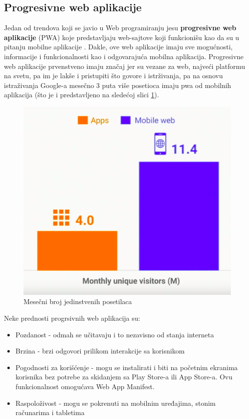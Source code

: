 \documentclass[a4paper]{article}
\begin{document}
\subsection{Progresivne web aplikacije}
\label{subsec:progresivne web aplikacije}

Jedan od trendova koji se javio u Web programiranju jesu \textbf{progresivne web aplikacije} (PWA) koje predstavljaju web-sajtove koji funkcionišu kao da su u pitanju mobilne aplikacije \cite{pwa}. Dakle, ove web aplikacije imaju sve mogućnosti, informacije i funkcionalnosti kao i odgovarajuća mobilna aplikacija. Progresivne web aplikacije prvenstveno imaju značaj jer su vezane za web, najveći platformu na svetu, pa im je lakše i pristupiti što govore i istrživanja, pa na osnovu istraživanja Google-a mesečno 3 puta više posetioca imaju pwa od mobilnih aplikacija (što je i predstavljeno na sledećoj slici \ref{fig:pwa}).

\begin{figure}[h!]
\begin{center}
\includegraphics[scale=0.4]{slike/pwa.png}
\end{center}
\caption{Mesečni broj jedinstvenih posetilaca}
\label{fig:pwa}
\end{figure}

Neke prednosti progrsivnih web aplikacija su:
\begin{itemize}
    \item Pozdanost - odmah se učitavaju i to nezavisno od stanja interneta
    \item Brzina - brzi odgovori prilikom interakcije sa korisnikom
    \item Pogodnosti za korišćenje - mogu se instalirati i biti na početnim ekranima korisnika bez potrebe za skidanjem sa Play Store-a ili App Store-a. Ovu funkcionalnost omogućava Web App Manifest.
    \item Raspoloživost - mogu se pokrenuti na mobilnim uređajima, stonim računarima i tabletima
\end{itemize}
\end{document}
